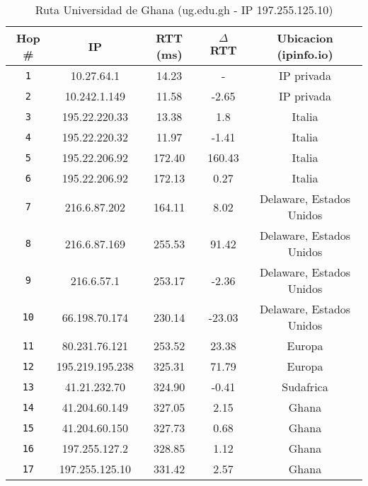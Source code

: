 \begin{table}[ht]\begin{center}
    \begin{tabular}{|c|c|c|c|c|}
    \hline
    \textbf{Hop \#} & \textbf{IP} & \textbf{RTT (ms)} & \textbf{$\Delta$ RTT} & \textbf{Ubicacion (ipinfo.io)} \\ \hline
    \texttt{1}  & 10.27.64.1      & 14.23             & -                     & IP privada                     \\ \hline
    \texttt{2}  & 10.242.1.149    & 11.58             & -2.65                 & IP privada                     \\ \hline
    \texttt{3}  & 195.22.220.33   & 13.38             & 1.8                   & Italia                         \\ \hline
    \texttt{4}  & 195.22.220.32   & 11.97             & -1.41                 & Italia                         \\ \hline
    \texttt{5}  & 195.22.206.92   & 172.40            & 160.43                & Italia                         \\ \hline
    \texttt{6}  & 195.22.206.92   & 172.13            & 0.27                  & Italia                         \\ \hline
    \texttt{7}  & 216.6.87.202    & 164.11            & 8.02                  & Delaware, Estados Unidos       \\ \hline
    \texttt{8}  & 216.6.87.169    & 255.53            & 91.42                 & Delaware, Estados Unidos       \\ \hline
    \texttt{9}  & 216.6.57.1      & 253.17            & -2.36                 & Delaware, Estados Unidos       \\ \hline
    \texttt{10} & 66.198.70.174   & 230.14            & -23.03                & Delaware, Estados Unidos       \\ \hline
    \texttt{11} & 80.231.76.121   & 253.52            & 23.38                 & Europa                         \\ \hline
    \texttt{12} & 195.219.195.238 & 325.31            & 71.79                 & Europa                         \\ \hline
    \texttt{13} & 41.21.232.70    & 324.90            & -0.41                 & Sudafrica                      \\ \hline
    \texttt{14} & 41.204.60.149   & 327.05            & 2.15                  & Ghana                          \\ \hline
    \texttt{15} & 41.204.60.150   & 327.73            & 0.68                  & Ghana                          \\ \hline
    \texttt{16} & 197.255.127.2   & 328.85            & 1.12                  & Ghana                          \\ \hline
    \texttt{17} & 197.255.125.10  & 331.42            & 2.57                  & Ghana                          \\ \hline
    \end{tabular}
    \caption{Ruta Universidad de Ghana (ug.edu.gh  - IP 197.255.125.10)}
\end{center}
\end{table}

